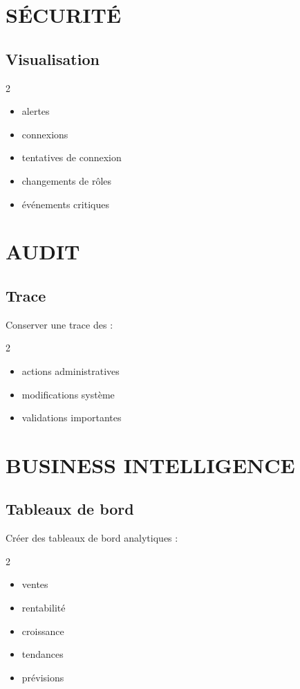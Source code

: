 \documentclass[12pt,a4paper,oneside]{book}
\begin{document}
\chapter{SÉCURITÉ}

\section{Visualisation}
\begin{multicols}{2}
\begin{itemize}
\item alertes
\item connexions
\item tentatives de connexion
\item changements de rôles
\item événements critiques
\end{itemize}
\end{multicols}

\chapter{AUDIT}

\section{Trace}
Conserver une trace des :
\begin{multicols}{2}
\begin{itemize}
\item actions administratives
\item modifications système
\item validations importantes
\end{itemize}
\end{multicols}

\chapter{BUSINESS INTELLIGENCE}

\section{Tableaux de bord}
Créer des tableaux de bord analytiques :
\begin{multicols}{2}
\begin{itemize}
\item ventes
\item rentabilité
\item croissance
\item tendances
\item prévisions
\end{itemize}
\end{multicols}
\end{document}
